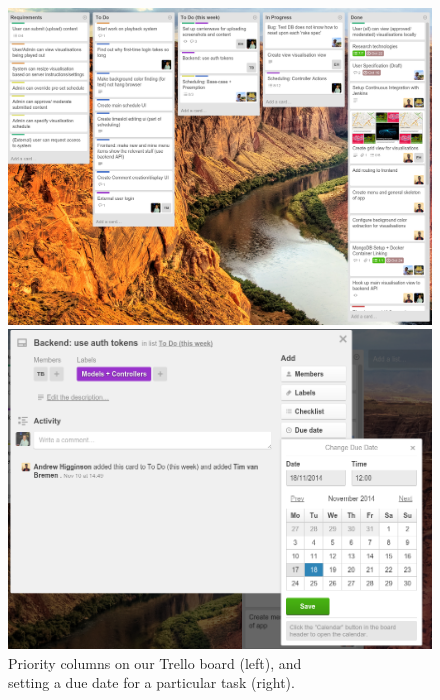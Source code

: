 \documentclass[a4paper]{article}
\begin{document}
\begin{figure}[H]
  \begin{minipage}{0.49\textwidth}
    \includegraphics[width = \textwidth]{./evaluation/trello-columns.png}
  \end{minipage}
  \begin{minipage}{0.49\textwidth}
    \includegraphics[width = \textwidth]{./evaluation/trello-due-date.png}
  \end{minipage}
  \caption{Priority columns on our Trello board (left), and \\ setting a due date for a particular task (right).}
  \label{fig:trello}
\end{figure}
\end{document}
